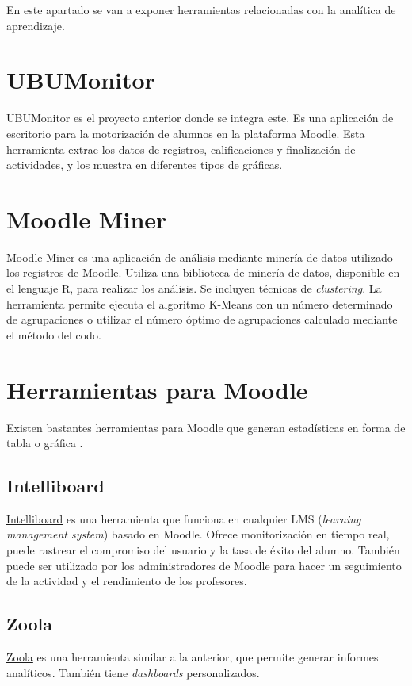 En este apartado se van a exponer herramientas relacionadas con la analítica de aprendizaje.

\section{UBUMonitor}
UBUMonitor \cite{yjx00032020Feb} es el proyecto anterior donde se integra este. Es una aplicación de escritorio para la motorización de alumnos en la plataforma Moodle. Esta herramienta extrae los datos de registros, calificaciones y finalización de actividades, y los muestra en diferentes tipos de gráficas.

\section{Moodle Miner}
Moodle Miner \cite{moodleMiner} es una aplicación de análisis mediante minería de datos utilizado los registros de Moodle. Utiliza una biblioteca de minería de datos, disponible en el lenguaje R, para realizar los análisis. Se incluyen técnicas de \emph{clustering}. La herramienta permite ejecuta el algoritmo K-Means con un número determinado de agrupaciones o utilizar el número óptimo de agrupaciones calculado mediante el método del codo.

\section{Herramientas para Moodle}
Existen bastantes herramientas para Moodle que generan estadísticas en forma de tabla o gráfica \cite{moodlePlugins}.

\subsection{Intelliboard}
\href{https://intelliboard.net/}{Intelliboard} es una herramienta que funciona en cualquier LMS (\emph{learning management system}) basado en Moodle. Ofrece monitorización en tiempo real, puede rastrear el compromiso del usuario y la tasa de éxito del alumno. También puede ser utilizado por los administradores de Moodle para hacer un seguimiento de la actividad y el rendimiento de los profesores.


\subsection{Zoola}
\href{https://www.zoola.io/}{Zoola} es una herramienta similar a la anterior, que permite generar informes analíticos. También tiene \emph{dashboards} personalizados.

